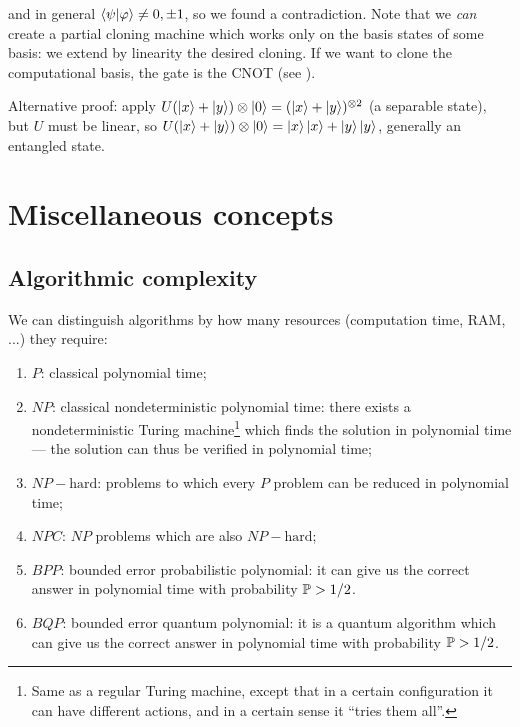 \documentclass[main.tex]{subfiles}
\begin{document}
and in general \(\braket{\psi}{\varphi} \neq 0,\pm 1\), so we found a contradiction. Note that we \emph{can} create a partial cloning machine which works only on the basis states of some basis: we extend by linearity the desired cloning. If we want to clone the computational basis, the gate is the CNOT (see ).

\begin{bluebox}
  Alternative proof: apply \(U (\ket{x} + \ket{y}) \otimes \ket{0} = (\ket{x} + \ket{y}) ^{\otimes 2} \) (a separable state), but \(U\) must be linear, so \(U (\ket{x} + \ket{y}) \otimes \ket{0} = \ket{x} \ket{x} + \ket{y} \ket{y} \), generally an entangled state.
\end{bluebox}

\section{Miscellaneous concepts}

\subsection{Algorithmic complexity}

We can distinguish algorithms by how many resources (computation time, RAM, ...) they require:

\begin{enumerate}
    \item \(P\): classical polynomial time;
    \item \(NP\): classical nondeterministic polynomial time: there exists a nondeterministic Turing machine\footnote{Same as a regular Turing machine, except that in a certain configuration it can have different actions, and in a certain sense it ``tries them all''.} which finds the solution in polynomial time --- the solution can thus be verified in polynomial time;
    \item \(NP-\text{hard}\): problems to which every \(P\) problem can be reduced in polynomial time;
    \item \(NPC\): \(NP\) problems which are also \(NP-\text{hard}\);
    \item \(BPP\): bounded error probabilistic polynomial: it can give us the correct answer in polynomial time with probability \(\P>1/2\).
    \item \(BQP\): bounded error quantum polynomial: it is a quantum algorithm which can give us the correct answer in polynomial time with probability \(\P>1/2\).
\end{enumerate}
\end{document}
